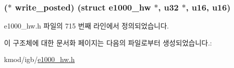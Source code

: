 \subsubsection[{\texorpdfstring{write\+\_\+posted}{write_posted}}]{($\ast$ write\+\_\+posted) (struct {\bf e1000\+\_\+hw} $\ast$, {\bf u32} $\ast$, {\bf u16}, {\bf u16})}\hypertarget{structe1000__mbx__operations_a953926983fe682ccf6dbe7988fc53679}{}\label{structe1000__mbx__operations_a953926983fe682ccf6dbe7988fc53679}


e1000\+\_\+hw.\+h 파일의 715 번째 라인에서 정의되었습니다.



이 구조체에 대한 문서화 페이지는 다음의 파일로부터 생성되었습니다.\+:\begin{DoxyCompactItemize}
\item 
kmod/igb/\hyperlink{kmod_2igb_2e1000__hw_8h}{e1000\+\_\+hw.\+h}\end{DoxyCompactItemize}

